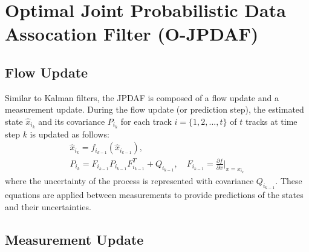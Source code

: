 \documentclass[10pt]{article}
\date{}
\theoremstyle{plain}\theorembodyfont{\normalfont}
\begin{document}
\section{Optimal Joint Probabilistic Data Assocation Filter (O-JPDAF)}

%


\subsection{Flow Update}
Similar to Kalman filters, the JPDAF is composed of a flow update and a measurement update. During the flow update (or prediction step), the estimated state $\hat x_{i_k}$ and its covariance $P_{i_k}$ for each track $i=\{1,2,...,t\}$ of $t$ tracks at time step $k$ is updated as follows:
\begin{gather}
\hat x_{i_{k}} = f_{i_{k-1}}( \hat x_{i_{k-1}}),\\
P_{i_{k}} = F_{i_{k-1}} P_{i_{k-1}} F_{i_{k-1}}^T + Q_{i_{k-1}}, \quad F_{i_{k-1}}=\frac{\partial f}{\partial x}\bigg|_{x=\hat x_{i_{k}} }
\end{gather}
where the uncertainty of the process is represented with covariance $Q_{i_{k-1}}$.
These equations are applied between measurements to provide predictions of the states and their uncertainties. %

\subsection{Measurement Update}
\end{document}
